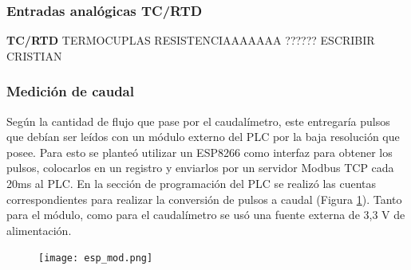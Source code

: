 \subsubsection{Entradas analógicas TC/RTD}
\textbf{TC/RTD} TERMOCUPLAS RESISTENCIAAAAAAA ??????
ESCRIBIR CRISTIAN




\subsubsection{Medición de caudal}
Según la cantidad de flujo que pase por el caudalímetro, este entregaría pulsos que debían ser leídos con un módulo externo del PLC por la baja resolución que posee. Para esto se planteó utilizar un ESP8266 como interfaz para obtener los pulsos, colocarlos en un registro y enviarlos por un servidor Modbus TCP cada 20ms al PLC. En la sección de programación del PLC se realizó las cuentas correspondientes para realizar la conversión de pulsos a caudal (Figura \ref{fig:modtcp}). Tanto para el módulo, como para el caudalímetro se usó una fuente externa de 3,3 V de alimentación.
\begin{figure}[htbp]
	\centering
	\texttt{[image: esp\_mod.png]}
	\label{fig:modtcp}
\end{figure}
\newpage


